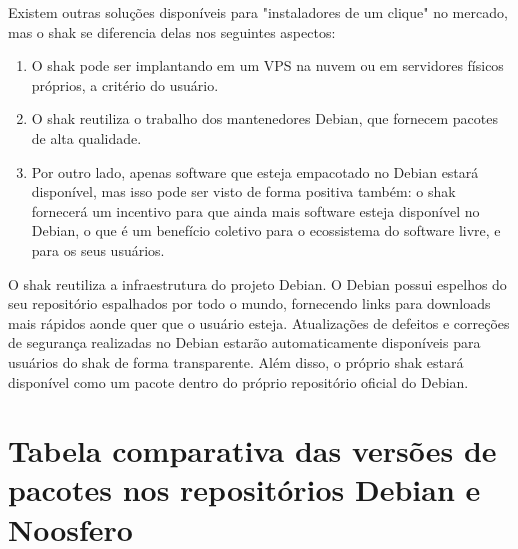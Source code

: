 \begin{anexosenv}
Existem outras soluções disponíveis para "instaladores de um clique" no
mercado, mas o shak se diferencia delas nos seguintes aspectos:

\begin{enumerate}
  \item O shak pode ser implantando em um VPS na nuvem ou em servidores físicos
  próprios, a critério do usuário.
  \item O shak reutiliza o trabalho dos mantenedores Debian, que fornecem pacotes
  de alta qualidade.
  \item Por outro lado, apenas software que esteja empacotado no Debian estará
  disponível, mas isso pode ser visto de forma positiva também: o shak
  fornecerá um incentivo para que ainda mais software esteja disponível no
  Debian, o que é um benefício coletivo para o ecossistema do software livre, e
  para os seus usuários.
\end{enumerate}

O shak reutiliza a infraestrutura do projeto Debian. O Debian possui espelhos 
do seu repositório espalhados por todo o mundo, fornecendo links para 
downloads mais rápidos aonde quer que o usuário esteja. Atualizações de 
defeitos e correções de segurança realizadas no Debian estarão automaticamente 
disponíveis para usuários do shak de forma transparente. Além disso, o 
próprio shak estará disponível como um pacote dentro do próprio repositório oficial do Debian.

\chapter{Tabela comparativa das versões de pacotes nos repositórios Debian e Noosfero}


\end{anexosenv}
